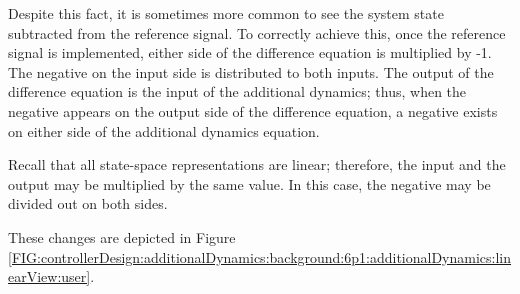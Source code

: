 \documentclass[crop=false,float=true,class=scrreprt]{standalone}
\begin{document}
Despite this fact, it is sometimes more common to see 
the system state subtracted from the reference signal.
To correctly achieve this,
once the reference signal is implemented,
either side of the difference equation is multiplied by -1.
The negative on the input side is distributed to both inputs.
The output of the difference equation is the input of the additional dynamics;
thus, when the negative appears on the output side of the difference equation,
a negative exists on either side of the additional dynamics equation.

Recall that all state-space representations are linear;
therefore, the input and the output may be multiplied by the same value.
In this case, the negative may be divided out on both sides.

These changes are depicted in Figure~%
\ref{FIG:controllerDesign:additionalDynamics:background:6p1:additionalDynamics:linearView:user}.




\clearpage
\end{document}
